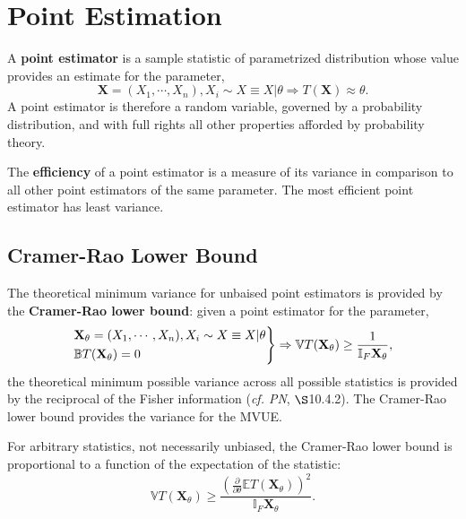 \documentclass[12pt, twoside, draft]{article}
\begin{document}
\section{Point Estimation}\label{sec:point_estimation}
A \textbf{point estimator} is a sample statistic of parametrized distribution whose value provides an estimate for the parameter,
\begin{equation}
\mathbf{X} = (X_1, \cdots, X_n), X_i \sim X \equiv X | \theta \Rightarrow T(\mathbf{X}) \approx \theta.
\end{equation}
A point estimator is therefore a random variable, governed by a probability distribution, and with full rights all other properties afforded by probability theory.

The \textbf{efficiency} of a point estimator is a measure of its variance in comparison to all other point estimators of the same parameter.  The most efficient point estimator has least variance.

\subsection{Cramer-Rao Lower Bound}\label{Cramer-Rao_lower_bound}
The theoretical minimum variance for unbaised point estimators is provided by the \textbf{Cramer-Rao lower bound}: given a point estimator for the parameter, 
\begin{equation}\label{eq:Cramer-Rao_unbiased}
\begin{rcases}
\mathbf{X}_\theta = (X_1, \cdots, X_n), X_i \sim X \equiv X | \theta \\
\mathbb{B} T(\mathbf{X}_\theta) = 0
\end{rcases} \Rightarrow
\mathbb{V} T(\mathbf{X}_\theta) \geq \frac{1}{\mathbb{I}_F \mathbf{X}_\theta},
\end{equation}
the theoretical minimum possible variance across all possible statistics is provided by the reciprocal of the Fisher information (\textit{cf. PN}, $\S$10.4.2).  The Cramer-Rao lower bound provides the variance for the MVUE.

For arbitrary statistics, not necessarily unbiased, the Cramer-Rao lower bound is proportional to a function of the expectation of the statistic:
\begin{equation}\label{eq:Cramer-Rao_arbitrary}
\mathbb{V} T(\mathbf{X}_\theta) \geq \frac{\left( \frac{\partial}{\partial \theta} \mathbb{E} T(\mathbf{X}_\theta) \right)^2}{\mathbb{I}_F \mathbf{X}_\theta}.
\end{equation}
\end{document}
